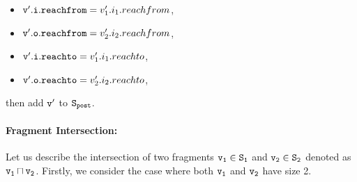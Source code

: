 \begin{itemize}
\begin{itemize}
\item $\mathtt{v}'.\mathtt{i}.\mathtt{reachfrom} = v_1'.i_1.reachfrom$,
\item $\mathtt{v}'.\mathtt{o}.\mathtt{reachfrom} = v_2'.i_2.reachfrom$,
\item $\mathtt{v}'.\mathtt{i}.\mathtt{reachto} = v_1'.i_1.reachto$,
\item $\mathtt{v}'.\mathtt{o}.\mathtt{reachto} = v_2'.i_2.reachto$,
\end{itemize} then add $\tt v'$ to $\tt S_{post}$. 


\newpage
 \end{itemize}
 
 \paragraph{Fragment Intersection:} Let us describe the intersection of two fragments $\tt v_1 \in S_1$ and $\tt v_2 \in S_2$ denoted as $\tt v_1 \sqcap v_2$. Firstly, we consider the case where both $\tt v_1$ and $\tt v_2$ have size 2.
